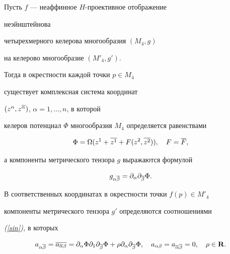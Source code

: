 \begin{thm}\label{sh-th2}


Пусть $f$ --- неаффинное $H$-проективное отображение


неэйнштейнова


четырехмерного келерова многообразия $(M_4,g)$


на келерово многообразие $(M'_4,g')$.


Тогда в окрестности каждой точки $p\in M_4$


существует комплексная система координат


$(z^{\alpha},z^{\overline\alpha})$, $\alpha=1,\dotsc,n$, в которой


келеров потенциал $\Phi$ многообразия $M_4$ определяется равенствами


\begin{equation}


\label{sh60}


\Phi =\Omega (z^1+\ol{z^1}+F(z^2,\ol{z^2})), \quad F=\ol F,


\end{equation}


а компоненты метрического тензора $g$ выражаются формулой


\begin{equation}


\label{kahl-a}


g_{\alpha\ol\beta}=\partial_{\alpha}\partial_{\ol\beta}\Phi.


\end{equation}





В соответственных координатах в окрестности точки $f(p) \in M'_{4}$


компоненты метрического тензора $g'$ определяются соотношениями


{\em (\ref{sin}),} в которых


\begin{equation}


\label{sh69}


a_{\alpha\ol\beta}= \ol{a_{\ol\alpha\beta}} =


\pl\alpha\Phi\pl 1\pl{\ol\beta}\Phi+


\rho\pl\alpha\pl{\ol\beta} \Phi,\quad


a_{\alpha\beta}=a_{\ol\alpha\ol\beta}=0, \quad


\rho\in{\bold R}.


\end{equation}


\end{thm}






